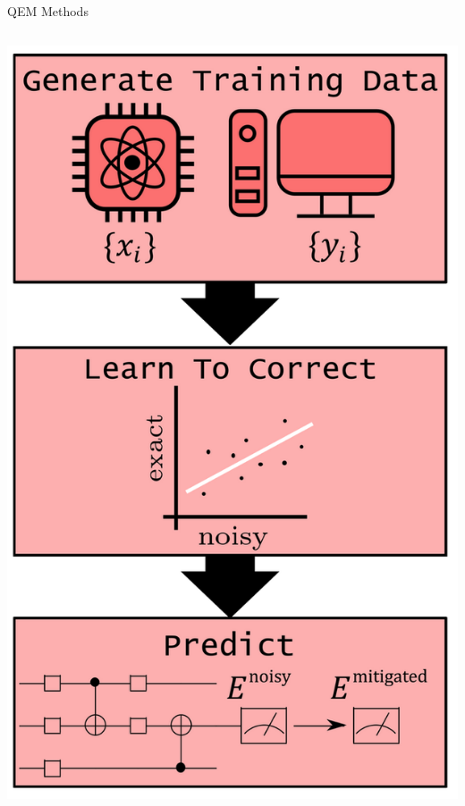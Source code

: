 \documentclass[11pt,aspectratio=1610,xcolor=dvipsnames]{beamer}
\begin{document}
\begin{frame}{QEM Methods}
\begin{columns}[T]
\begin{column}{0.33\textwidth}
\begin{tcolorbox}[title=Learning-based methods,halign title=center,halign=center,colback=gray!20, colframe=gray!70]
				\includegraphics[width=\textwidth]{learning-based.png}
			\end{tcolorbox}

		\end{column}
	\end{columns}

\end{frame}
\end{document}
